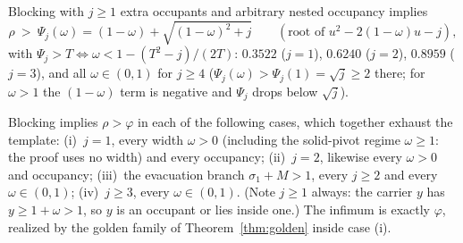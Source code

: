 \documentclass[10pt,a4paper]{amsart}
\begin{document}
\begin{proposition}\label{prop:DPsij}
Blocking with $j\ge1$ extra occupants and arbitrary nested occupancy
implies
\[
\rho\ >\ \Psi_j(\omega)=(1-\omega)+\sqrt{(1-\omega)^2+j}
\qquad(\text{root of }u^2-2(1-\omega)u-j),
\]
with $\Psi_j>T\iff\omega<1-(T^2-j)/(2T)$: $0.3522$ ($j=1$), $0.6240$
($j=2$), $0.8959$ ($j=3$), and all $\omega\in(0,1)$ for $j\ge4$
($\Psi_j(\omega)>\Psi_j(1)=\sqrt j\ge2$ there; for $\omega>1$ the
$(1-\omega)$ term is negative and $\Psi_j$ drops below $\sqrt j$).
\end{proposition}

\begin{theorem}
\label{thm:DP}
Blocking implies $\rho>\varphi$ in each of the following cases, which
together exhaust the template: (i)~$j=1$, every width $\omega>0$
(including the solid-pivot regime $\omega\ge1$: the proof uses no width)
and every occupancy; (ii)~$j=2$, likewise every $\omega>0$ and occupancy;
(iii)~the evacuation branch $\sigma_1+M>1$, every $j\ge2$ and every
$\omega\in(0,1)$; (iv)~$j\ge3$, every $\omega\in(0,1)$. (Note $j\ge1$
always: the carrier $y$ has $y\ge1+\omega>1$, so $y$ is an occupant or
lies inside one.) The infimum is exactly $\varphi$, realized by the
golden family of Theorem~\ref{thm:golden} inside case (i).
\end{theorem}
\end{document}

